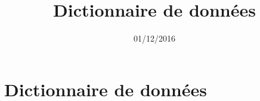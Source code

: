 \documentclass[asi, sansVersion]{picInsa}
\begin{document}
\title{Dictionnaire de données}
\author{\Julie}
\date{01/12/2016} 

\maketitle

\tableofcontents

\chapter{Dictionnaire de données}

\end{document}
